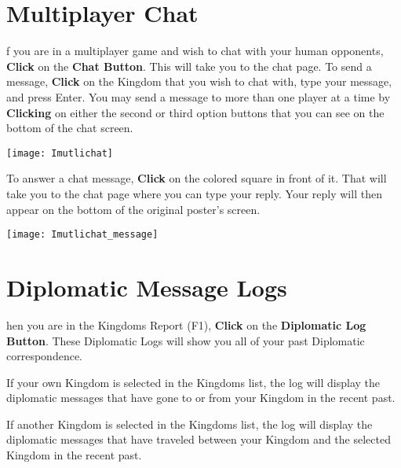 \section{Multiplayer Chat}


f you are in a multiplayer game and wish to chat with your human opponents, \textbf{Click} on the \textbf{Chat Button}. This will take you to the chat page. To send a message, \textbf{Click} on the Kingdom that you wish to chat with, type your message, and press Enter. You may send a message to more than one player at a time by \textbf{Clicking} on either the second or third option buttons that you can see on the bottom of the chat screen.

\begin{center}
    \texttt{[image: Imutlichat]} %
\end{center}

To answer a chat message, \textbf {Click} on the colored square in front of it. That will take you to the chat page where you can type your reply. Your reply will then appear on the bottom of the original poster’s screen.

\begin{center}
    \texttt{[image: Imutlichat\_message]} %
\end{center}

\section{Diplomatic Message Logs}


hen you are in the Kingdoms Report (F1), \textbf{Click} on the \textbf{Diplomatic Log Button}. These Diplomatic Logs will show you all of your past Diplomatic correspondence.

If your own Kingdom is selected in the Kingdoms list, the log will display the diplomatic messages that have gone to or from your Kingdom in the recent past.

If another Kingdom is selected in the Kingdoms list, the log will display the diplomatic messages that have traveled between your Kingdom and the selected Kingdom in the recent past.